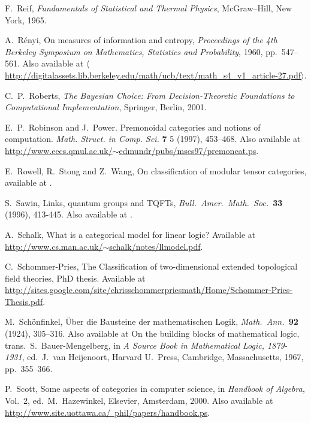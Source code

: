 \documentclass[12pt,twoside,openright]{report}
\begin{document}
\begin{thebibliography}{99}
 F.\ Reif, {\sl Fundamentals of Statistical and Thermal Physics}, McGraw--Hill, New York, 1965.

 A.\ R\'enyi, On measures of information and entropy,
\textsl{Proceedings of the 4th Berkeley Symposium on Mathematics, Statistics and Probability}, 1960, pp.\ 547--561.  Also available at
\href{http://digitalassets.lib.berkeley.edu/math/ucb/text/math_s4_v1_article-27.pdf}
{$\langle$http://digitalassets.lib.berkeley.edu/math/ucb/text/math\_s4\_v1\_article-27.pdf$\rangle$}.

 C.\ P.\ Roberts, 
{\sl The Bayesian Choice: From Decision-Theoretic Foundations to Computational Implementation}, Springer, Berlin, 2001.

 E.\ P.\ Robinson and J.\ Power. Premonoidal categories and notions of computation. \textsl{Math. Struct. in Comp. Sci.} \textbf{7} 5 (1997), 453--468.  Also available at \href{http://www.eecs.qmul.ac.uk/~edmundr/pubs/mscs97/premoncat.ps}{http://www.eecs.qmul.ac.uk/$\sim$edmundr/pubs/mscs97/premoncat.ps}.

 E.\ Rowell, R.\ Stong and Z.\ Wang, On classification of modular tensor categories, available at .

 S.\ Sawin, Links, quantum groups and TQFTs,
{\sl Bull.\ Amer.\ Math.\ Soc.\ }{\bf 33} (1996), 413-445. Also available at .

 A.\ Schalk, What is a categorical model for linear logic?  Available at \hfill \break
\href{http://www.cs.man.ac.uk/~schalk/notes/llmodel.pdf}
{http://www.cs.man.ac.uk/$\sim$schalk/notes/llmodel.pdf}.

 C.\ Schommer-Pries, The Classification of two-dimensional extended topological field theories, PhD thesis. Available at
\href{http://sites.google.com/site/chrisschommerpriesmath/Home/Schommer-Pries-Thesis.pdf}{http://sites.google.com/site/chrisschommerpriesmath/Home/Schommer-Pries-Thesis.pdf}.

 M.\ Sch\"onfinkel, \"Uber die Bausteine der mathematischen Logik, {\sl Math.\ Ann.\ }{\bf 92} (1924), 305--316. Also available at On the building blocks of mathematical logic, trans.\ S.\ Bauer-Mengelberg, in {\sl A Source Book in Mathematical Logic, 1879-1931}, ed.\ J.\ van Heijenoort, Harvard U.\ Press, Cambridge, Massachusetts, 1967, pp.\ 355--366.

 P.\ Scott, Some aspects of categories in computer science, in {\sl Handbook of Algebra}, Vol.\ 2, ed.\ M.\ Hazewinkel, Elsevier, Amsterdam, 2000. Also available at \\
\href{http://www.site.uottawa.ca/~phil/papers/handbook.ps}
{http://www.site.uottawa.ca/~phil/papers/handbook.ps}.


\end{thebibliography}
\end{document}
